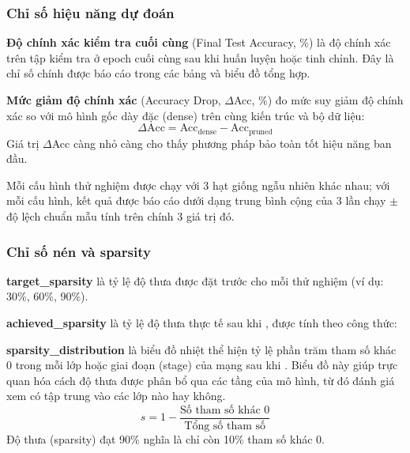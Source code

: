         \subsubsection{Chỉ số hiệu năng dự đoán}
        \label{subsec:accuracy}
            \textbf{Độ chính xác kiểm tra cuối cùng} (Final Test Accuracy, \%) là độ chính xác trên tập kiểm tra ở epoch cuối cùng sau khi huấn luyện hoặc tinh chỉnh. Đây là chỉ số chính được báo cáo trong các bảng và biểu đồ tổng hợp.

            \textbf{Mức giảm độ chính xác} (Accuracy Drop, $\Delta$Acc, \%) đo mức suy giảm độ chính xác so với mô hình gốc dày đặc (dense) trên cùng kiến trúc và bộ dữ liệu:
        \begin{equation}
            \Delta\text{Acc} = \text{Acc}_{\text{dense}} - \text{Acc}_{\text{pruned}}
        \end{equation}
        Giá trị $\Delta$Acc càng nhỏ càng cho thấy phương pháp \pruning bảo toàn tốt hiệu năng ban đầu.

        Mỗi cấu hình thử nghiệm được chạy với 3 hạt giống ngẫu nhiên khác nhau; với mỗi cấu hình, kết quả được báo cáo dưới dạng trung bình cộng của 3 lần chạy $\pm$ độ lệch chuẩn mẫu tính trên chính 3 giá trị đó.

        \subsubsection{Chỉ số nén và sparsity}
        \label{subsec:compression_metrics}

            \textbf{\gls{target_sparsity}} là tỷ lệ độ thưa được đặt trước cho mỗi thử nghiệm (ví dụ: 30\%, 60\%, 90\%).

            \textbf{\gls{achieved_sparsity}} là tỷ lệ độ thưa thực tế sau khi \pruning, được tính theo công thức:

            \textbf{\gls{sparsity_distribution}} là biểu đồ nhiệt thể hiện tỷ lệ phần trăm tham số khác 0 trong mỗi lớp hoặc giai đoạn (stage) của mạng sau khi \pruning. Biểu đồ này giúp trực quan hóa cách độ thưa được phân bổ qua các tầng của mô hình, từ đó đánh giá xem \pruning có tập trung vào các lớp nào hay không.
        \begin{equation}
            s = 1 - \frac{\text{Số tham số khác 0}}{\text{Tổng số tham số}}
        \end{equation}
        Độ thưa (sparsity) đạt 90\% nghĩa là chỉ còn 10\% tham số khác 0.

